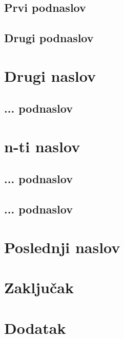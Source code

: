 \documentclass[a4paper]{article}
\begin{document}
 


\subsection{Prvi podnaslov}
\label{subsec:podnaslov1}



\subsection{Drugi podnaslov}
\label{subsec:podnaslov2}



\section{Drugi naslov}
\label{sec:naslov2}

 

\subsection{... podnaslov}
\label{subsec:podnaslovN}



\section{n-ti naslov}
\label{sec:naslovN}


\subsection{... podnaslov}
\label{subsec:podnaslovK}

 

\subsection{... podnaslov}
\label{subsec:podnaslovM}

 

\section{Poslednji naslov}
\label{sec:naslovM}




\section{Zaključak}
\label{sec:zakljucak}

 


\appendix

\iffalse
 

\fi

\begin{thebibliography}{9}





\end{thebibliography}


\appendix
\section{Dodatak}
\end{document}
